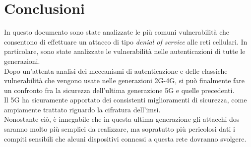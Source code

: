 \chapter{Conclusioni}
In questo documento sono state analizzate le più comuni vulnerabilità che consentono di effettuare un 
attacco di tipo \textit{denial of service} alle reti cellulari. In particolare, sono state analizzate le vulnerabilità nelle autenticazioni 
di tutte le generazioni.\\
Dopo un'attenta analisi dei meccanismi di autenticazione e delle classiche vulnerabilità che vengono usate nelle generazioni 2G-4G, si può finalmente
fare un confronto fra la sicurezza dell'ultima generazione 5G e quelle precedenti.\\
Il 5G ha sicuramente apportato dei consistenti miglioramenti di sicurezza, come ampiamente trattato riguardo la cifratura dell'\gls{imsi}.\\
Nonostante ciò, è innegabile che in questa ultima generazione gli attacchi \gls{dos} saranno molto più semplici da realizzare, ma sopratutto più pericolosi dati
i compiti sensibili che alcuni dispositivi connessi a questa rete dovranno svolgere.